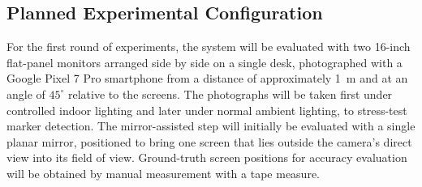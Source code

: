 \documentclass[english,hidelinks]{sbrt}
\begin{document}
\subsection{Planned Experimental Configuration}
For the first round of experiments, the system will be evaluated with two 16-inch flat-panel monitors arranged side by side on a single desk, photographed with a Google Pixel 7 Pro smartphone from a distance of approximately 1~m and at an angle of $45^\circ$ relative to the screens. The photographs will be taken first under controlled indoor lighting and later under normal ambient lighting, to stress-test marker detection. The mirror-assisted step will initially be evaluated with a single planar mirror, positioned to bring one screen that lies outside the camera's direct view into its field of view. Ground-truth screen positions for accuracy evaluation will be obtained by manual measurement with a tape measure.
\end{document}
